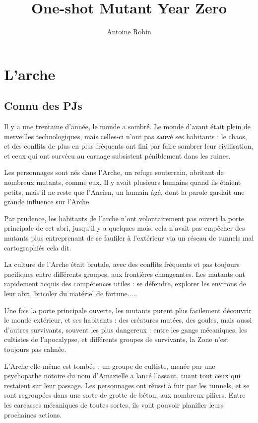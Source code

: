\documentclass[10pt,a4paper]{article}
\author{ Antoine Robin}
\title{One-shot Mutant Year Zero}
\begin{document}
\maketitle
\section{L'arche}
\subsection{Connu des PJs}
Il y a une trentaine d'année, le monde a sombré. Le monde d'avant était plein de merveilles technologiques, mais celles-ci n'ont pas sauvé ses habitants : le chaos, et des conflits de plus en plus fréquents ont fini par faire sombrer leur civilisation, et ceux qui ont survécu au carnage subsistent péniblement dans les ruines.

Les personnages sont nés dans l'Arche, un refuge souterrain, abritant de nombreux mutants, comme eux. Il y avait plusieurs humains quand ils étaient petits, mais il ne reste que l'Ancien, un humain âgé, dont la parole gardait une grande influence sur l'Arche. 

Par prudence, les habitants de l'arche n'ont volontairement pas ouvert la porte principale de cet abri, jusqu'il y a quelques mois. cela n'avait pas empêcher des mutants plus entreprenant de se faufiler à l'extérieur via un réseau de tunnels mal cartographiés cela dit.

La culture de l'Arche était brutale, avec des conflits fréquents et pas toujours pacifiques entre différents groupes, aux frontières changeantes. Les mutants ont rapidement acquis des compétences utiles : se défendre, explorer les environs de leur abri, bricoler du matériel de fortune.....

Une fois la porte principale ouverte, les mutants purent plus facilement découvrir le monde extérieur, et ses habitants : des créatures mutées, des goules, mais aussi d'autres survivants, souvent les plus dangereux : entre les gangs mécaniques, les cultistes de l'apocalypse, et différents groupes de survivants, la Zone n'est toujours pas calmée.

L'Arche elle-même est tombée : un groupe de cultiste, menée par une psychopathe notoire du nom d'Amazielle a lancé l'assaut, tuant tout ceux qui restaient sur leur passage. Les personnages ont réussi à fuir par les tunnels, et se sont regroupées dans une sorte de grotte de béton, aux nombreux piliers. Entre les carcasses mécaniques de toutes sortes, ils vont pouvoir planifier leurs prochaines actions.
\end{document}
